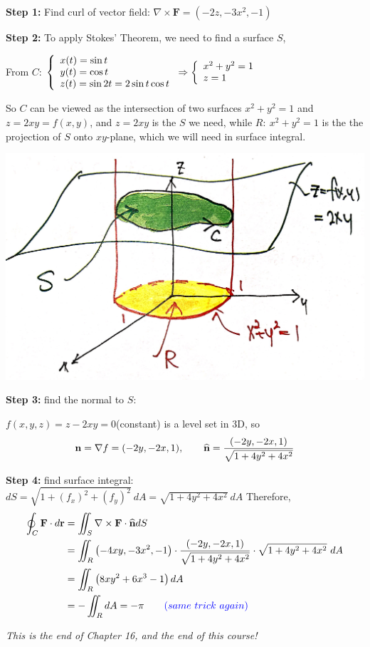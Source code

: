 \documentclass[11pt, a4paper]{MATH2023}
\newcommand{\nm}{\widehat{\bf n}}
\begin{document}
\begin{spacing}{1.3}
    {\bf Step 1:} Find curl of vector field: $\nabla \times \mathbf{F}=\left(-2 z,-3 x^{2},-1\right)$
    
    {\bf Step 2:} To apply Stokes' Theorem, we need to find a surface $S$,

    From $C$: $\displaystyle \left\{\begin{array}{l}
        x(t)=\sin t\\ y(t)=\cos t\\ z(t)=\sin 2t=2\sin t\cos t
    \end{array} \right. \Rightarrow  
    \left\{\begin{array}{l}
        x^2+y^2=1\\ z=1
    \end{array} \right.$
    
    So $C$ can be viewed as the intersection of two surfaces $x^2+y^2=1$ and $z=2xy=f(x,y)$,
    and $z=2xy$ is the $S$ we need, while $R:\ x^2+y^2=1$ is the the projection of $S$
    onto $xy$-plane, which we will need in surface integral.
    \begin{center}
        \includegraphics[scale=0.1]{images/Ch16-ex4.5.JPG}
    \end{center}

    {\bf Step 3:} find the normal to $S$:
    
    $f(x, y, z)=z-2 x y=0$(constant) is a level set in 3D, so 
    $$\mathbf{n}=\nabla f=(-2 y,-2 x, 1),\qquad \nm=\frac{(-2 y,-2 x, 1)}{\sqrt{1+4y^2+4x^2}}$$
    
    {\bf Step 4:} find surface integral:
    $dS=\sqrt{1+(f_x)^2+(f_y)^2}\ dA=\sqrt{1+4y^2+4x^2}\ dA$
    Therefore,
    $$\begin{aligned}
    \oint_{C} \mathbf{F} \cdot d \mathbf{r} &=\iint_{S} \nabla \times \mathbf{F} \cdot \widehat{\mathbf{n}} d S \\
    &=\iint_{R}\left(-4 x y,-3 x^{2},-1\right) \cdot \frac{(-2 y,-2 x, 1)}{\sqrt{1+4y^2+4x^2}} \cdot \sqrt{1+4y^2+4x^2}\ dA \\
    &=\iint_{R}\left(8 x y^{2}+6 x^{3}-1\right) d A \\
    &=-\iint_R dA = -\pi\qquad {\color{blue}(same\ trick\ again)}
    \end{aligned}$$

    \newpage
    \vspace*{\fill}
    \begin{center}
        {\it \large This is the end of Chapter 16, and the end of this course!}
    \end{center}

    

\end{spacing}
\end{document}

